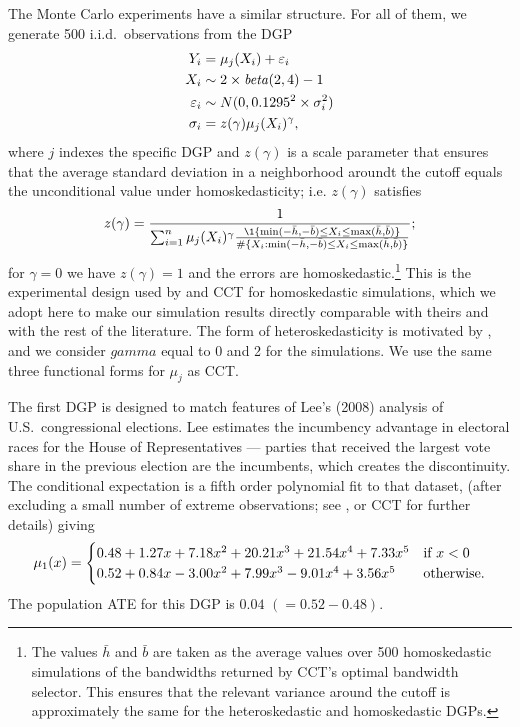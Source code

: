 \documentclass[12pt,fleqn]{article}
\begin{document}
The Monte Carlo experiments have a similar structure. For all of them, we
generate 500 i.i.d.\ observations from the DGP
\begin{align*}
Y_{i}           &= \mu_{j}(X_{i}) + \varepsilon_{i} \\
X_{i}           &\sim  2 \times \operatorname{\mathit{beta}}(2,4) - 1 \\
\varepsilon_{i} &\sim N(0, 0.1295^2 \times \sigma_i^2) \\
\sigma_i &= z(\gamma) \mu_{j}(X_{i})^\gamma ,
\end{align*}
where $j$ indexes the specific DGP and $z(\gamma)$ is a scale parameter that
ensures that the average standard deviation in a neighborhood aroundt the cutoff
equals the unconditional value under homoskedasticity; i.e. $z(\gamma)$
satisfies
\[
  z(\gamma)
    = \frac{1}{\sum_{i = 1}^n \mu_{j}(X_{i})^{\gamma}
    \frac{\1\{\min(-\bar h, -\bar b) \leq X_i \leq \max(\bar h,\bar b)\}}
    {\#\{X_i : \min(-\bar h, -\bar b) \leq X_i \leq \max(\bar h, \bar b)\}}};
\]
for $\gamma = 0$ we have $z(\gamma) = 1$ and the errors are
homoskedastic.\footnote{%
  The values $\bar h$ and $\bar b$ are taken as the average values over 500
  homoskedastic simulations of the bandwidths returned by CCT's optimal
  bandwidth selector. This ensures that the relevant variance around the cutoff
  is approximately the same for the heteroskedastic and homoskedastic DGPs.} %
This is the experimental design used by \citet{IK} and CCT for homoskedastic
simulations, which we adopt here to make our simulation results directly
comparable with theirs and with the rest of the literature.  The form of
heteroskedasticity is motivated by \cite{mackinnon2013thirty}, and we consider
$gamma$ equal to 0 and 2 for the simulations.
We use the same three functional forms for $\mu_{j}$ as CCT.

\nocite{lee2008rand}%
The first DGP is designed to match features of Lee's (2008) analysis of U.S.\
congressional elections. Lee estimates the incumbency advantage in electoral
races for the House of Representatives --- parties that received the largest
vote share in the previous election are the incumbents, which creates the
discontinuity. The conditional expectation is a fifth order polynomial fit to
that dataset, (after excluding a small number of extreme observations; see
\citealp{IK}, or CCT for further details) giving
\begin{equation*}
  \mu_{1}(x) =
  \begin{cases}
    0.48 + 1.27x + 7.18x^{2} + 20.21x^{3} + 21.54x^{4} + 7.33x^{5}
    & \text{if}\ x < 0 \\
    0.52 + 0.84x - 3.00x^{2} + 7.99x^3 - 9.01x^4 + 3.56x^{5}
    & \text{otherwise}.
  \end{cases}
\end{equation*}
The population ATE for this DGP is $0.04$ $(= 0.52 - 0.48)$.
\end{document}
